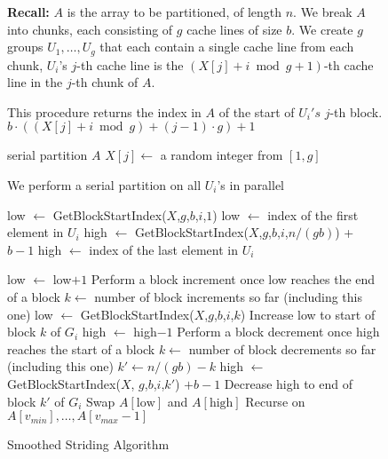 \documentclass[twoside,leqno,twocolumn]{article}
\begin{document}
\begin{figure*}
  \caption{Smoothed Striding Algorithm}
	\label{alg:parallelPartition_smoothedStriding}
	\begin{algorithmic}%
    \State \textbf{Recall:} 
    \State $A$ is the array to be partitioned, of length $n$. 
    \State We break $A$ into chunks, each consisting of $g$ cache lines of size $b$.
    \State We create $g$ groups $U_1,\ldots, U_g$ that each contain a single cache line from each chunk,
    \State $U_i$'s $j$-th cache line is the $(X[j]+i \bmod g + 1)$-th cache line in the $j$-th chunk of $A$.
    \State

      \Comment This procedure returns the index in $A$ of the start of $U_i's$ $j$-th block.
      \State\Return $b\cdot ((X[j] + i \bmod g) +(j-1)\cdot g)+1$
    \EndProcedure
    \State

        \State serial partition $A$
      \Else
          \State $X[j] \gets$ a random integer from $[1,g]$ 
        \EndFor

         \Comment We perform a serial partition on all $U_i$'s in parallel

          \State low $\gets$ GetBlockStartIndex($X$,$g$,$b$,$i$,$1$)
          \Comment low $\gets$ index of the first element in $U_i$
          \State high $\gets$ GetBlockStartIndex($X$,$g$,$b$,$i$,$n/(gb)$) + $b-1$
          \Comment high $\gets$ index of the last element in $U_i$

              \State low $\gets$ low$+1$
                \Comment Perform a block increment once low reaches the end of a block
                \State $k \gets $ number of block increments so far (including this one)
                \State low $\gets$ GetBlockStartIndex($X$,$g$,$b$,$i$,$k$)
                \Comment Increase low to start of block $k$ of $G_i$
              \EndIf
            \EndWhile
              \State high $\gets$ high$-1$
                \Comment Perform a block decrement once high reaches the start of a block
                \State $k \gets $ number of block decrements so far (including this one)
                \State $k' \gets n/(gb) - k$
                \State high $\gets$ GetBlockStartIndex($X$, $g$,$b$,$i$,$k'$) $+b-1$
                \Comment Decrease high to end of block $k'$ of $G_i$
              \EndIf
            \EndWhile
            \State Swap $A[\text{low}]$ and $A[\text{high}]$
          \EndWhile
        \EndFor
        \State Recurse on $A[v_{min}],\ldots,A[v_{max}-1]$
      \EndIf
    \EndProcedure
	\end{algorithmic}	
\end{figure*}
\end{document}
